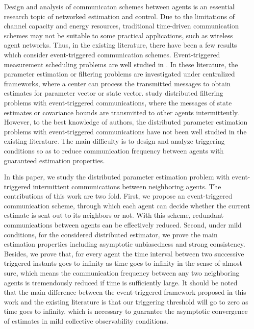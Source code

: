 \documentclass[10pt,journal,final]{IEEEtran}
\theoremstyle{plain}
\theoremstyle{definition}
\theoremstyle{remark}
\begin{document}
Design and analysis of communicaton schemes between agents is an essential research topic of networked estimation and control. Due to the limitations of channel capacity and energy resources, traditional time-driven communication schemes may not be suitable to some practical applications, such as wireless agent networks.
Thus, in the existing literature, there have been a  few results which consider   event-triggered communication schemes. 
Event-triggered measurement scheduling problems  are well studied in \cite{you2013asymptotically,shi2014event,mo2012kalman,sinopoli2004kalman,han2015optimal,han2015stochastic,weimer2012distributed}. In these literature, the parameter estimation or filtering problems are investigated under  centralized frameworks, where a center can process the transmitted messages to obtain estimates for parameter vector or state vector. \cite{He2017On,battistelli2018distributed,he2017distributed} study   distributed  filtering problems with  event-triggered communications, where the messages of state estimates or covariance bounds are transmitted to other agents intermittently. 
However, to the best knowledge of authors, the distributed parameter estimation problems  with event-triggered communications have not been well studied in the existing literature. The main difficulty is to design and analyze triggering conditions so as to reduce  communication frequency between agents with guaranteed  estimation properties.



In this paper, we study the distributed parameter estimation problem with event-triggered intermittent communications between neighboring agents.
The contributions of this work are two fold. First, we propose  an event-triggered communication scheme, through which each agent can decide whether the current estimate is sent out to its neighbors or not.   With this scheme, redundant communications between agents can be effectively reduced. Second, under mild conditions, for the considered distributed estimator, we prove the main estimation properties including asymptotic unbiasedness and strong consistency. Besides, 
we prove that,   for every agent the time interval between two successive triggered instants goes to infinity as time goes to infinity
  in the sense of almost sure, which means the communication frequency between any two neighboring agents is tremendously reduced if time is sufficiently large.  
  It should be noted that the main difference between the event-triggered framework proposed in this work and the existing literature is that our triggering threshold will go to zero as time goes to infinity, which is necessary to guarantee the asymptotic convergence of estimates in mild collective observability conditions.
\end{document}
